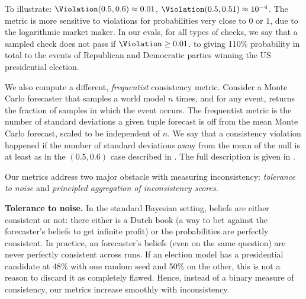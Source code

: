 

To illustrate: $\Violation(0.5,0.6)\approx 0.01$, $\Violation(0.5,0.51)\approx 10^{-4}$.
The metric is more sensitive to violations for probabilities very close to $0$ or $1$, due to the logarithmic market maker.
In our evals, for all types of checks, we say that a sampled check does not pass if $\Violation \ge 0.01$.
 to
giving 110\% probability in total to the events of Republican and Democratic parties winning the US presidential election.

\label{subcfc/sec:frequentist-metric}

We also compute a different, \emph{frequentist} consistency metric. Consider a Monte Carlo forecaster that samples a world model $n$ times, and for any event, returns the fraction of samples in which the event occurs. The frequentist metric is the number of standard deviations a given tuple forecast is off from the mean Monte Carlo forecast, scaled to be independent of $n$. We say that a consistency violation happened if the number of standard deviations away from the mean of the null is at least as in the $(0.5, 0.6)$ case described in . The full description is given in .



Our metrics address two major obstacle with measuring inconsistency: \emph{tolerance to noise} and \emph{principled aggregation of inconsistency scores}.

\textbf{Tolerance to noise.}
In the standard Bayesian setting, beliefs are either consistent or not: there either is a Dutch book (a way to bet against the forecaster's beliefs to get infinite profit) or the probabilities are perfectly consistent.
In practice, an forecaster's beliefs (even on the same question) are never perfectly consistent across runs. If an election model has a presidential candidate at 48\% with one random seed and 50\% on the other, this is not a reason to discard it as completely flawed. Hence, instead of a binary measure of consistency, our metrics increase smoothly with inconsistency.

